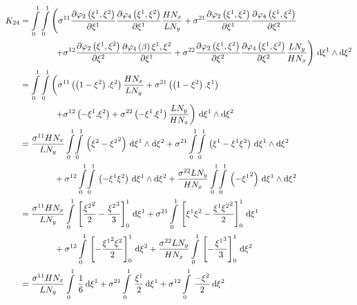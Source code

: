\begin{equation}
  \begin{aligned}
    K_{24}&=\dintl{0}{1}\dintl{0}{1}\left(
    \conductivitytensorsymbol^{11}\delby{\lbfn{2}{\xione,\xitwo}}{\xione}
    \delby{\lbfn{4}{\xione,\xitwo}}{\xione}\dfrac{H N_{x}}{L N_{y}}+
    \conductivitytensorsymbol^{21}\delby{\lbfn{2}{\xione,\xitwo}}{\xione}
    \delby{\lbfn{4}{\xione,\xitwo}}{\xitwo}\right.\\
    &\qquad\qquad\left.+\conductivitytensorsymbol^{12}\delby{\lbfn{2}{\xione,\xitwo}}{\xitwo}
    \delby{\lbfn{4}{\beta}{\xione,\xitwo}}{\xione}+
    \conductivitytensorsymbol^{22}\delby{\lbfn{2}{\xione,\xitwo}}{\xitwo}
    \delby{\lbfn{4}{\xione,\xitwo}}{\xitwo}\dfrac{L N_{y}}{H N_{x}}\right)\infinitesimaltwo{\xione}{\xitwo}\\
    &=\dintl{0}{1}\dintl{0}{1}\left(
    \conductivitytensorsymbol^{11}\pbrac{\pbrac{1-\xitwo}.\xitwo}\dfrac{H N_{x}}{L N_{y}}+
    \conductivitytensorsymbol^{21}\pbrac{\pbrac{1-\xitwo}.\xione}\right.\\
    &\qquad\qquad\left.+\conductivitytensorsymbol^{12}\pbrac{-\xione.\xitwo}+
    \conductivitytensorsymbol^{22}\pbrac{-\xione.\xione}\dfrac{L N_{y}}{H N_{x}}\right)
    \infinitesimaltwo{\xione}{\xitwo}\\
    &=\dfrac{\conductivitytensorsymbol^{11} H N_{x}}{L N_{y}}\giint{0}{1}{0}{1}{\pbrac{\xitwo-\xitwosq}}{\xione}{\xitwo}
    +\conductivitytensorsymbol^{21}\giint{0}{1}{0}{1}{\pbrac{\xione-\xione\xitwo}}{\xione}{\xitwo}\\
    &\qquad\qquad+\conductivitytensorsymbol^{12}\giint{0}{1}{0}{1}{\pbrac{-\xione\xitwo}}{\xione}{\xitwo}
    +\dfrac{\conductivitytensorsymbol^{22} L N_{y}}{H N_{x}}\giint{0}{1}{0}{1}{\pbrac{-\xionesq}}{\xione}{\xitwo} \\
    &=\dfrac{\conductivitytensorsymbol^{11} H N_{x}}{L N_{y}}\gint{0}{1}{\sqbrac{\dfrac{\xitwosq}{2}-\dfrac{\xitwocube}{3}}^{1}_{0}}{\xione}
    +\conductivitytensorsymbol^{21}\gint{0}{1}{\sqbrac{\xione\xitwo-\dfrac{\xione\xitwosq}{2}}^{1}_{0}}{\xione}\\
    &\qquad\qquad+\conductivitytensorsymbol^{12}\gint{0}{1}{\sqbrac{-\dfrac{\xionesq\xitwo}{2}}^{1}_{0}}{\xitwo}
    +\dfrac{\conductivitytensorsymbol^{22} L N_{y}}{H N_{x}}\gint{0}{1}{\sqbrac{-\dfrac{\xionecube}{3}}^{1}_{0}}{\xitwo} \\
    &=\dfrac{\conductivitytensorsymbol^{11} H N_{x}}{L N_{y}}\gint{0}{1}{\dfrac{1}{6}}{\xione}
    +\conductivitytensorsymbol^{21}\gint{0}{1}{\dfrac{\xione}{2}}{\xione}
    +\conductivitytensorsymbol^{12}\gint{0}{1}{\dfrac{-\xitwo}{2}}{\xitwo}

\end{aligned}
\end{equation}
